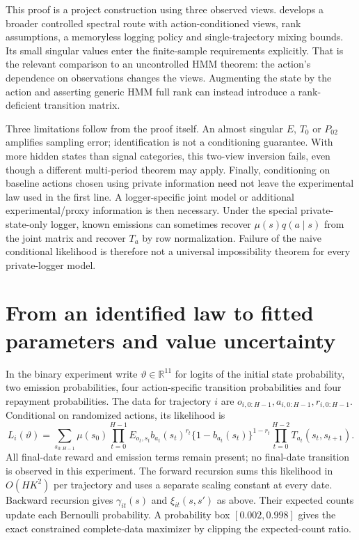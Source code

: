 This proof is a project construction using three observed views.
\citet[Sections 3.1--3.2]{spectral2016} develops a broader controlled
spectral route with action-conditioned views, rank assumptions, a
memoryless logging policy and single-trajectory mixing bounds. Its small
singular values enter the finite-sample requirements explicitly. That is
the relevant comparison to an uncontrolled HMM theorem: the action's
dependence on observations changes the views. Augmenting the state by
the action and asserting generic HMM full rank can instead introduce a
rank-deficient transition matrix.

Three limitations follow from the proof itself. An almost singular $E$,
$T_0$ or $P_{02}$ amplifies sampling error; identification is not a
conditioning guarantee. With more hidden states than signal categories,
this two-view inversion fails, even though a different multi-period theorem
may apply. Finally, conditioning on baseline actions chosen using private
information need not leave the experimental law used in the first line.
A logger-specific joint model or additional experimental/proxy information
is then necessary. Under the special private-state-only logger, known
emissions can sometimes recover $\mu(s)q(a\mid s)$ from the joint matrix
and recover $T_a$ by row normalization. Failure of the naive conditional
likelihood is therefore not a universal impossibility theorem for every
private-logger model.

\section{From an identified law to fitted parameters and value uncertainty}
\label{s4:latent-inference}
In the binary experiment write $\vartheta\in\mathbb R^{11}$ for logits
of the initial state probability, two emission probabilities, four
action-specific transition probabilities and four repayment probabilities.
The data for trajectory $i$ are $o_{i,0:H-1},a_{i,0:H-1},r_{i,0:H-1}$.
Conditional on randomized actions, its likelihood is
\[
 L_i(\vartheta)=\sum_{s_{0:H-1}}\mu(s_0)
 \prod_{t=0}^{H-1}E_{o_t,s_t}
     b_{a_t}(s_t)^{r_t}\{1-b_{a_t}(s_t)\}^{1-r_t}
 \prod_{t=0}^{H-2}T_{a_t}(s_t,s_{t+1}).
\]
All final-date reward and emission terms remain present; no final-date
transition is observed in this experiment. The forward recursion sums
this likelihood in $O(HK^2)$ per trajectory and uses a separate scaling
constant at every date. Backward recursion gives $\gamma_{it}(s)$ and
$\xi_{it}(s,s')$ as above. Their expected counts update each Bernoulli
probability. A probability box $[0.002,0.998]$ gives the exact constrained
complete-data maximizer by clipping the expected-count ratio.

